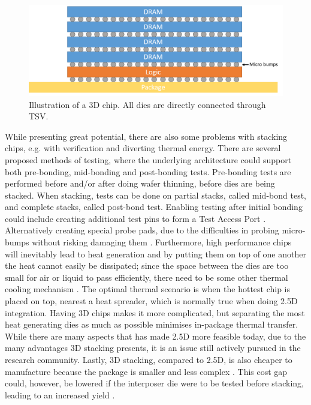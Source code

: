 \begin{figure}[!ht]
\centering
\includegraphics[width=0.75\linewidth]{figure/3D-integration.png}
\caption{Illustration of a 3D chip. All dies are directly connected through TSV.}
\label{3D-chip}
\end{figure}

While presenting great potential, there are also some problems with stacking chips, e.g. with verification and diverting thermal energy. There are several proposed methods of testing, where the underlying architecture could support both pre-bonding, mid-bonding and post-bonding tests. Pre-bonding tests are performed before and/or after doing wafer thinning, before dies are being stacked. When stacking, tests can be done on partial stacks, called mid-bond test, and complete stacks, called post-bond test. Enabling testing after initial bonding could include creating additional test pins to form a Test Access Port \cite{Marinissen:2012:CES:2492708.2493023}. Alternatively creating special probe pads, due to the difficulties in probing micro-bumps without risking damaging them \cite{5751450}. Furthermore, high performance chips will inevitably lead to heat generation and by putting them on top of one another the heat cannot easily be dissipated; since the space between the dies are too small for air or liquid to pass efficiently, there need to be some other thermal cooling mechanism \cite{5501261}. The optimal thermal scenario is when the hottest chip is placed on top, nearest a heat spreader, which is normally true when doing 2.5D integration. Having 3D chips makes it more complicated, but separating the most heat generating dies as much as possible minimises in-package thermal transfer. While there are many aspects that has made 2.5D more feasible today, due to the many advantages 3D stacking presents, it is an issue still actively pursued in the research community. Lastly, 3D stacking, compared to 2.5D, is also cheaper to manufacture because the package is smaller and less complex \cite{6263032}. This cost gap could, however, be lowered if the interposer die were to be tested before stacking, leading to an increased yield \cite{6542130}.


